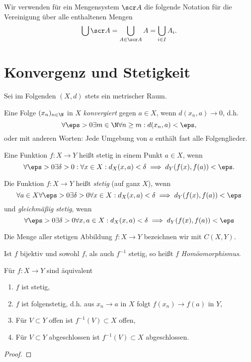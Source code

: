 
\begin{nt}
	Wir verwenden für ein Mengensystem $\scr A$ die folgende Notation für die Vereinigung über alle enthaltenen Mengen
	\[
		\bigcup \scr A
		= \bigcup_{A \in \scr A} A
		= \bigcup_{i\in I} A_i.
	\]
\end{nt}


\section{Konvergenz und Stetigkeit}

Sei im Folgenden $(X,d)$ stets ein metrischer Raum.

\begin{df}
	Eine Folge $(x_n)_{n\in \N}$ in $X$ \emph{konvergiert} gegen $a \in X$, wenn $d(x_n, a) \to 0$, d.h.
	\[
		\forall \eps > 0 \exists m \in \N \forall n \ge m : d(x_n, a) < \eps,
	\]
	oder mit anderen Worten: Jede Umgebung von $a$ enthält fast alle Folgenglieder.
\end{df}

\begin{df}
	Eine Funktion $f: X \to Y$ heißt stetig in einem Punkt $a \in X$, wenn
	\[
		\forall \eps > 0 \exists \delta > 0 : \forall x \in X : d_X(x,a) < \delta \implies d_Y(f(x), f(a)) < \eps.
	\]

	Die Funktion $f: X \to Y$ heißt \emph{stetig} (auf ganz $X$), wenn
	\[
		\forall a \in X \forall \eps > 0 \exists \delta > 0 \forall x \in X: d_X(x,a) < \delta \implies d_Y(f(x), f(a)) < \eps
	\]
	und \emph{gleichmäßig stetig}, wenn
	\[
		\forall \eps > 0 \exists \delta > 0 \forall x,a \in X: d_X(x,a) < \delta \implies d_Y(f(x), f(a)) < \eps
	\]

	Die Menge aller stetigen Abbildung $f: X \to Y$ bezeichnen wir mit $C(X,Y)$.

	Ist $f$ bijektiv und sowohl $f$, als auch $f^{-1}$ stetig, so heißt $f$ \emph{Homöomorphismus}.
\end{df}

\begin{st}
	Für $f: X \to Y$ sind äquivalent
	\begin{enumerate}[1)]
		\item
			$f$ ist stetig,
		\item
			$f$ ist folgenstetig, d.h. aus $x_n \to a$ in $X$ folgt $f(x_n) \to f(a)$ in $Y$,
		\item
			Für $V \subset Y$ offen ist $f^{-1}(V) \subset X$ offen,
		\item
			Für $V \subset Y$ abgeschlossen ist $f^{-1}(V) \subset X$ abgeschlossen.
	\end{enumerate}
	\begin{proof}
	\end{proof}
\end{st}


